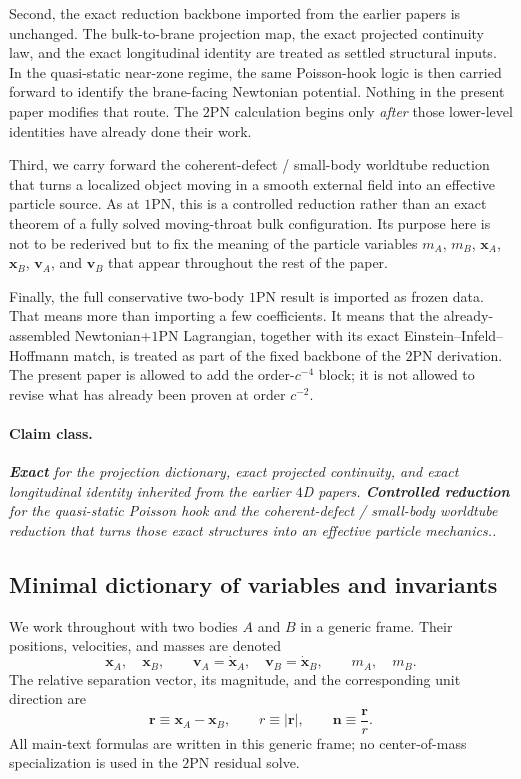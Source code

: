 \documentclass[11pt]{article}
\newcommand{\vct}{\mathbf v}
\newcommand{\nvec}{\mathbf n}
\newcommand{\OnePN}{\mathrm{1PN}}
\newcommand{\TwoPN}{\mathrm{2PN}}
\newcommand{\Exact}{\textbf{Exact}}
\newcommand{\Controlled}{\textbf{Controlled reduction}}
\newcommand{\claimclass}[1]{\paragraph{Claim class.}\emph{#1.}}
\begin{document}
Second, the exact reduction backbone imported from the earlier papers is unchanged.
The bulk-to-brane projection map, the exact projected continuity law, and the exact
longitudinal identity are treated as settled structural inputs. In the quasi-static
near-zone regime, the same Poisson-hook logic is then carried forward to identify the
brane-facing Newtonian potential. Nothing in the present paper modifies that route.
The \(\TwoPN\) calculation begins only \emph{after} those lower-level identities have
already done their work.

Third, we carry forward the coherent-defect / small-body worldtube reduction that turns
a localized object moving in a smooth external field into an effective particle source.
As at \(\OnePN\), this is a controlled reduction rather than an exact theorem of a fully
solved moving-throat bulk configuration. Its purpose here is not to be rederived but to
fix the meaning of the particle variables \(m_A\), \(m_B\), \(\mathbf x_A\), \(\mathbf x_B\),
\(\vct_A\), and \(\vct_B\) that appear throughout the rest of the paper.

Finally, the full conservative two-body \(\OnePN\) result is imported as frozen data.
That means more than importing a few coefficients. It means that the already-assembled
Newtonian+\(\OnePN\) Lagrangian, together with its exact Einstein--Infeld--Hoffmann
match, is treated as part of the fixed backbone of the \(\TwoPN\) derivation. The
present paper is allowed to add the order-\(c^{-4}\) block; it is not allowed to revise
what has already been proven at order \(c^{-2}\).

\claimclass{\Exact{} for the projection dictionary, exact projected continuity, and
exact longitudinal identity inherited from the earlier \(4\)D papers. \Controlled{}
for the quasi-static Poisson hook and the coherent-defect / small-body worldtube
reduction that turns those exact structures into an effective particle mechanics.}

\subsection{Minimal dictionary of variables and invariants}
\label{sec:carry-forward-dictionary}

We work throughout with two bodies \(A\) and \(B\) in a generic frame. Their positions,
velocities, and masses are denoted
\[
\mathbf x_A,\quad \mathbf x_B,
\qquad
\vct_A=\dot{\mathbf x}_A,
\quad
\vct_B=\dot{\mathbf x}_B,
\qquad
m_A,\quad m_B.
\]
The relative separation vector, its magnitude, and the corresponding unit direction are
\begin{equation}
\mathbf r\equiv \mathbf x_A-\mathbf x_B,
\qquad
r\equiv |\mathbf r|,
\qquad
\nvec\equiv \frac{\mathbf r}{r}.
\label{eq:carry-forward-rn}
\end{equation}
All main-text formulas are written in this generic frame; no center-of-mass
specialization is used in the \(\TwoPN\) residual solve.
\end{document}
